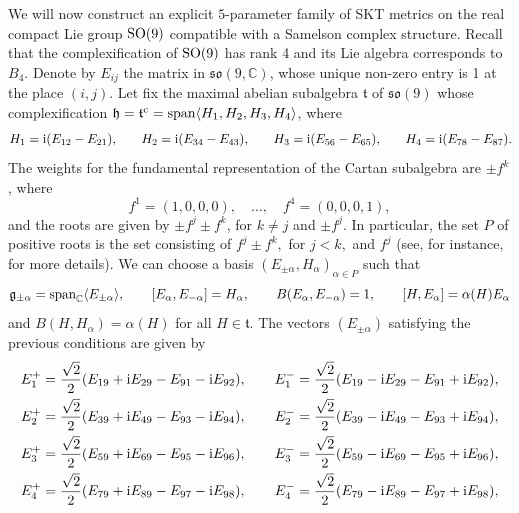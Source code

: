 \documentclass[pdftex]{sigma}
\numberwithin{equation}{section}
\begin{document}
\begin{Example} We will now construct an explicit $5$-parameter family of SKT metrics on the real compact Lie group ${\rm SO}(9)$ compatible with a Samelson complex structure. Recall that the complexification of ${\rm SO}(9)$ has rank 4 and its Lie algebra corresponds to $B_4$. Denote by $E_{ij}$ the matrix in ${\mathfrak {so}}(9, \mathbb C)$, whose unique non-zero entry is 1 at the place $(i,j)$. Let fix the maximal abelian subalgebra $\mathfrak t$ of ${\mathfrak {so}} (9)$ whose complexification $\mathfrak h= \mathfrak t ^{\rm c} = \operatorname{span} \langle H_1, H_2, H_3, H_4\rangle$, where
\begin{gather*}
H_1 = {\rm i} (E_{12} - E_{21}), \qquad\! H_2 = {\rm i} (E_{34} - E_{43}), \qquad\! H_3 = {\rm i} (E_{56} - E_{65}), \qquad\! H_4 = {\rm i} (E_{78} - E_{87}).\!
\end{gather*}
The weights for the fundamental representation of the Cartan subalgebra are $\pm f^k$, where
\[
f^1 = (1,0,0,0), \quad\dots,\quad f^4 = (0,0,0,1),
\]
 and the roots are given by $\pm f^j \pm f^k$, for $k \neq j$ and $\pm f^j$. In particular, the set $P$ of positive roots is the set consisting of $ f^j \pm f^k ,$ for $ j < k,$ and $f^j$ (see, for instance, \cite{St} for more details). We can choose a basis $(E_{\pm \alpha}, H_{\alpha})_{\alpha \in P}$ such that
 \[
 \mathfrak g_{\pm \alpha}= {\rm {span}}_{\mathbb C} \langle E_{\pm\alpha}\rangle, \qquad [E_{\alpha}, E_{-\alpha}]=H_{\alpha}, \qquad B(E_{\alpha}, E_{-\alpha}) = 1, \qquad [H, E_{\alpha}] = \alpha(H)E_{\alpha}
 \]
 and $B(H, H_{\alpha}) = \alpha(H)$ for all $H \in \mathfrak t$. The vectors $(E_{ \pm \alpha})$ satisfying the previous conditions are given by
\begin{gather*}
E_1^+ = \frac{\sqrt{2}}{2} (E_{19} + {\rm i} E_{29} - E_{91} - {\rm i} E_{92}), \qquad E_1^- = \frac{\sqrt{2}}{2} (E_{19} - {\rm i} E_{29} - E_{91}+ {\rm i} E_{92}),\\
E_2^+ = \frac{\sqrt{2}}{2} (E_{39} + {\rm i} E_{49} - E_{93} - {\rm i} E_{94}), \qquad E_2^- = \frac{\sqrt{2}}{2} (E_{39} - {\rm i} E_{49} - E_{93} + {\rm i} E_{94}),\\
E_3^+ = \frac{\sqrt{2}}{2} (E_{59} + {\rm i} E_{69} - E_{95} - {\rm i} E_{96}), \qquad E_3^- = \frac{\sqrt{2}}{2} (E_{59} - {\rm i} E_{69} - E_{95} + {\rm i} E_{96}),\\
E_4^+ = \frac{\sqrt{2}}{2} (E_{79} + {\rm i} E_{89} - E_{97} - {\rm i} E_{98}), \qquad E_4^- = \frac{\sqrt{2}}{2} (E_{79} - {\rm i} E_{89} - E_{97} + {\rm i} E_{98}),\\

\end{gather*}
\end{Example}
\end{document}
